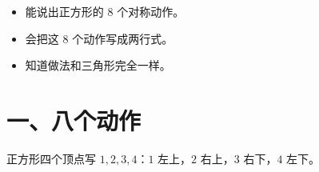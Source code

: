 


\begin{mubiao}
  \begin{itemize}
    \item 能说出正方形的 \(8\) 个对称动作。
    \item 会把这 \(8\) 个动作写成两行式。
    \item 知道做法和三角形完全一样。
  \end{itemize}
\end{mubiao}

\section*{一、八个动作}

\noindent 正方形四个顶点写 \(1,2,3,4\)：\quad \(1\) 左上，\(2\) 右上，\(3\) 右下，\(4\) 左下。


